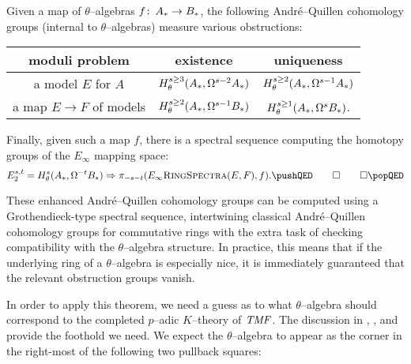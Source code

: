 \begin{theorem}
Given a map of \(\theta\)--algebras \(f\colon\thinspace A_* \to B_*\), the following Andr\'e--Quillen cohomology groups (internal to \(\theta\)--algebras) measure various obstructions:
\begin{center}
\begin{tabular}{@{}ccc@{}} \toprule
moduli problem & existence & uniqueness \\
\midrule
a model \(E\) for \(A\) & \(H^{s \ge 3}_\theta(A_*, \Omega^{s-2} A_*)\) & \(H^{s \ge 2}_\theta(A_*, \Omega^{s-1} A_*)\) \\
a map \(E \to F\) of models & \(H^{s \ge 2}_\theta(A_*, \Omega^{s-1} B_*)\) & \(H^{s \ge 1}_\theta(A_*, \Omega^s B_*)\). \\
 \bottomrule
\end{tabular}
\end{center}
Finally, given such a map \(f\), there is a spectral sequence computing the homotopy groups of the \(E_\infty\) mapping space: \[E_2^{s, t} = H^s_\theta(A_*, \Loops^{-t} B_*) \Rightarrow \pi_{-s-t}(\EinftyRings(E, F), f). \pushQED\qed\qedhere\popQED\]
\end{theorem}

\begin{remark}
These enhanced Andr\'e--Quillen cohomology groups can be computed using a Grothendieck-type spectral sequence, intertwining classical Andr\'e--Quillen cohomology groups for commutative rings with the extra task of checking compatibility with the \(\theta\)--algebra structure.  In practice, this means that if the underlying ring of a \(\theta\)--algebra is especially nice, it is immediately guaranteed that the relevant obstruction groups vanish.
\end{remark}

In order to apply this theorem, we need a guess as to what \(\theta\)--algebra should correspond to the completed \(p\)--adic \(K\)--theory of \(\mathit{TMF}\).  The discussion in , , and  provide the foothold we need.  We expect the \(\theta\)--algebra to appear as the corner in the right-most of the following two pullback squares:

\begin{center}
\end{center}

